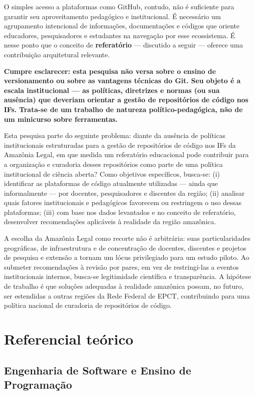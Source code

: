 \documentclass[english, spanish, brazilian]{RBIEarticle}
\begin{document}
	O simples acesso a plataformas como GitHub, contudo, não é suficiente para garantir seu aproveitamento pedagógico e institucional. É necessário um agrupamento intencional de informações, documentações e códigos que oriente educadores, pesquisadores e estudantes na navegação por esse ecossistema. É nesse ponto que o conceito de \textbf{referatório} — discutido a seguir — oferece uma contribuição arquitetural relevante.
	
	\textbf{Cumpre esclarecer: esta pesquisa não versa sobre o ensino de versionamento ou sobre as vantagens técnicas do Git. Seu objeto é a escala institucional — as políticas, diretrizes e normas (ou sua ausência) que deveriam orientar a gestão de repositórios de código nos IFs. Trata-se de um trabalho de natureza político-pedagógica, não de um minicurso sobre ferramentas.}
	
	Esta pesquisa parte do seguinte problema: diante da ausência de políticas institucionais estruturadas para a gestão de repositórios de código nos IFs da Amazônia Legal, em que medida um referatório educacional pode contribuir para a organização e curadoria desses repositórios como parte de uma política institucional de ciência aberta? Como objetivos específicos, busca-se: (i) identificar as plataformas de código atualmente utilizadas — ainda que informalmente — por docentes, pesquisadores e discentes da região; (ii) analisar quais fatores institucionais e pedagógicos favorecem ou restringem o uso dessas plataformas; (iii) com base nos dados levantados e no conceito de referatório, desenvolver recomendações aplicáveis à realidade da região amazônica.
	
	A escolha da Amazônia Legal como recorte não é arbitrária: suas particularidades geográficas, de infraestrutura e de concentração de docentes, discentes e projetos de pesquisa e extensão a tornam um lócus privilegiado para um estudo piloto. Ao submeter recomendações à revisão por pares, em vez de restringi-las a eventos institucionais internos, busca-se legitimidade científica e transparência. A hipótese de trabalho é que soluções adequadas à realidade amazônica possam, no futuro, ser estendidas a outras regiões da Rede Federal de EPCT, contribuindo para uma política nacional de curadoria de repositórios de código.
	
	\section{Referencial teórico}
	
	\subsection{Engenharia de Software e Ensino de Programação}
	
\end{document}
